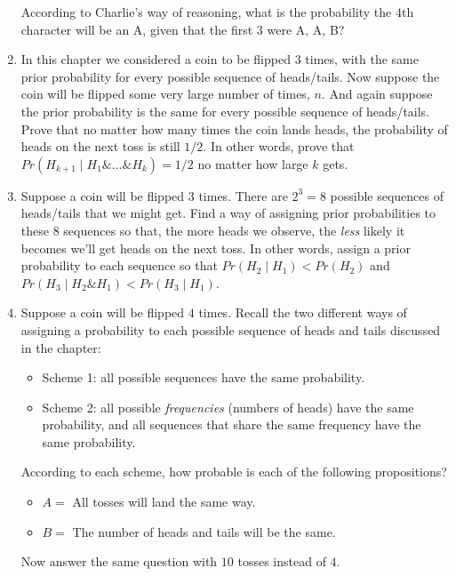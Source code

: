 \documentclass[justified]{tufte-book}
\providecommand{\tightlist}{%
  \setlength{\itemsep}{0pt}\setlength{\parskip}{0pt}}
\newcommand{\given}{\mid}
\renewcommand{\wedge}{\mathbin{\&}}
\newcommand{\p}{Pr}
\theoremstyle{definition}
\theoremstyle{definition}
\theoremstyle{definition}
\theoremstyle{definition}
\theoremstyle{remark}
\begin{document}
\begin{enumerate}
  According to Charlie's way of reasoning, what is the probability the \(4\)th character will be an A, given that the first \(3\) were A, A, B?
\item
  In this chapter we considered a coin to be flipped \(3\) times, with the same prior probability for every possible sequence of heads/tails. Now suppose the coin will be flipped some very large number of times, \(n\). And again suppose the prior probability is the same for every possible sequence of heads/tails. Prove that no matter how many times the coin lands heads, the probability of heads on the next toss is still \(1/2\). In other words, prove that \(\p(H_{k+1} \given H_1 \wedge \ldots \wedge H_{k}) = 1/2\) no matter how large \(k\) gets.
\item
  Suppose a coin will be flipped \(3\) times. There are \(2^3 = 8\) possible sequences of heads/tails that we might get. Find a way of assigning prior probabilities to these \(8\) sequences so that, the more heads we observe, the \emph{less} likely it becomes we'll get heads on the next toss. In other words, assign a prior probability to each sequence so that \(\p(H_2 \given H_1) < \p(H_2)\) and \(\p(H_3 \given H_2 \wedge H_1) < \p(H_3 \given H_1)\).
\item
  Suppose a coin will be flipped \(4\) times. Recall the two different ways of assigning a probability to each possible sequence of heads and tails discussed in the chapter:

  \begin{itemize}
  \tightlist
  \item
    Scheme 1: all possible sequences have the same probability.
  \item
    Scheme 2: all possible \emph{frequencies} (numbers of heads) have the same probability, and all sequences that share the same frequency have the same probability.
  \end{itemize}

  According to each scheme, how probable is each of the following propositions?

  \begin{itemize}
  \tightlist
  \item
    \(A =\) All tosses will land the same way.\\
  \item
    \(B =\) The number of heads and tails will be the same.
  \end{itemize}

  Now answer the same question with \(10\) tosses instead of \(4\).
\end{enumerate}
\end{document}
